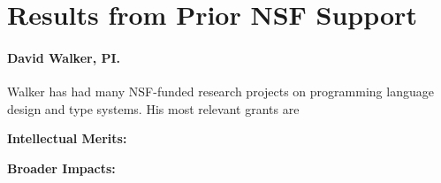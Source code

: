 \section{Results from Prior NSF Support}
\label{sec:prior-support}

\paragraph{David Walker, PI.}
Walker has had many NSF-funded research projects on programming language
design and type systems.  His most relevant grants are

{\bf Intellectual Merits:}

{\bf Broader Impacts:} 





 




